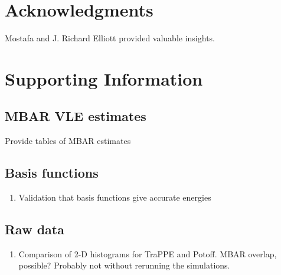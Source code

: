 \documentclass[journal=jced,manuscript=article]{achemso}
\begin{document}
\section{Acknowledgments}

Mostafa and J. Richard Elliott provided valuable insights.



\section{Supporting Information}

\subsection{MBAR VLE estimates}

Provide tables of MBAR estimates

\subsection{Basis functions}

\begin{enumerate}
	\item Validation that basis functions give accurate energies
\end{enumerate}

\subsection{Raw data}

\begin{enumerate}
	\item Comparison of 2-D histograms for TraPPE and Potoff. MBAR overlap, possible? Probably not without rerunning the simulations.
\end{enumerate}
\end{document}
